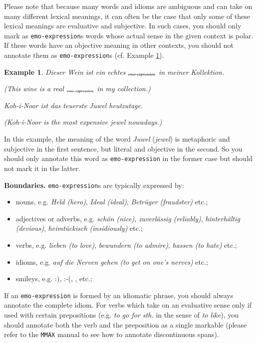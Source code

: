 \documentclass[11pt,a4paper]{article}
\theoremstyle{mytheoremstyle}
\newtheorem{exmp}{Example}[section]
\newcommand{\mtag}[2]{{\upshape[\emph{#2}\upshape]$_{\textrm{\bfseries\emph{\tiny
        #1}}}$}}
\newcommand{\emoexpression}[2][]{\mtag{emo-\-ex\-pression\ifstrempty{#1}{}{:#1}}{#2}}
\begin{document}
Please note that because many words and idioms are ambiguous and can take on
many different lexical meanings, it can often be the case that only some of
these lexical meanings are evaluative and subjective.  In such cases, you
should only mark as \texttt{emo-expression}s words whose actual sense in the
given context is polar.  If these words have an objective meaning in other
contexts, you should not annotate them as \texttt{emo-expression}s
(cf. Example \ref{exmp:emo-expression-jewel}).
\begin{exmp}
  Dieser Wein ist ein echtes \emoexpression{Juwel} in meiner
  Kollektion.

  (This wine is a real \emoexpression{jewel} in my collection.)

  Koh-i-Noor ist das teuerste Juwel heutzutage.

  (Koh-i-Noor is the most expensive jewel nowadays.)\label{exmp:emo-expression-jewel}
\end{exmp}
\noindent{}In this example, the meaning of the word \textit{Juwel}
(\textit{jewel}) is metaphoric and subjective in the first sentence, but
literal and objective in the second.  So you should only annotate this word as
\texttt{emo-expression} in the former case but should not mark it in the
latter.

\noindent\textbf{Boundaries.} \texttt{emo-expression}s are typically
expressed by:
\begin{itemize}
  \item nouns, e.g. \textit{Held (hero)}, \textit{Ideal (ideal)},
    \textit{Betr\"uger (fraudster)} etc.;

  \item adjectives or adverbs, e.g. \textit{sch\"on (nice)},
    \textit{zuverl\"assig (reliably)}, \textit{hinterh\"altig
      (devious)}, \textit{heimt\"uckisch (insidiously)} etc.;

  \item verbs, e.g. \textit{lieben (to love)}, \textit{bewundern (to
    admire)}, \textit{hassen (to hate)} etc.;

  \item idioms, e.g. \textit{auf die Nerven gehen (to get on one's
    nerves)} etc.;

  \item smileys, e.g. :), :-(, \smiley{}, \frownie{} etc.;
\end{itemize}
If an \texttt{emo-expression} is formed by an idiomatic phrase, you should
always annotate the complete idiom.  For verbs which take on an evaluative
sense only if used with certain prepositions (e.g. \textit{to go for sth.} in
the sense of \textit{to like}), you should annotate both the verb and the
preposition as a single markable (please refer to the \texttt{MMAX} manual to
see how to annotate discontinuous spans).
\end{document}

